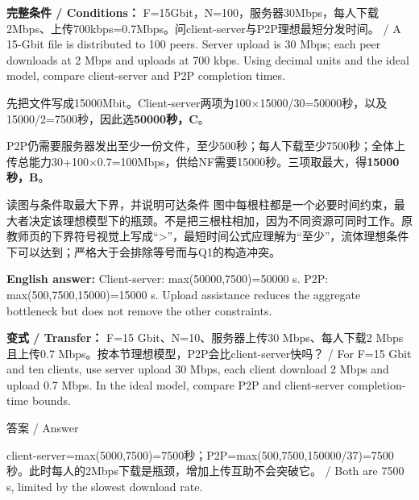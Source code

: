 \textbf{完整条件 / Conditions：} F=15Gbit，N=100，服务器30Mbps，每人下载2Mbps、上传700kbps=0.7Mbps。问client-server与P2P理想最短分发时间。 / A 15-Gbit file is distributed to 100 peers. Server upload is 30 Mbps; each peer downloads at 2 Mbps and uploads at 700 kbps. Using decimal units and the ideal model, compare client-server and P2P completion times.


先把文件写成15000Mbit。Client-server两项为100\ensuremath{\times}15000/30=50000秒，以及15000/2=7500秒，因此选\textbf{50000秒，C}。


P2P仍需要服务器发出至少一份文件，至少500秒；每人下载至少7500秒；全体上传总能力30+100\ensuremath{\times}0.7=100Mbps，供给NF需要15000秒。三项取最大，得\textbf{15000秒，B}。




\begin{StudyBlock}{读图与条件}{取最大下界，并说明可达条件}
图中每根柱都是一个必要时间约束，最大者决定该理想模型下的瓶颈。不是把三根柱相加，因为不同资源可同时工作。原教师页的下界符号视觉上写成“>”，最短时间公式应理解为“至少”，流体理想条件下可以达到；严格大于会排除等号而与Q1的构造冲突。
\end{StudyBlock}


\textbf{English answer:} Client-server: max(50000,7500)=50000 s. P2P: max(500,7500,15000)=15000 s. Upload assistance reduces the aggregate bottleneck but does not remove the other constraints.


\textbf{变式 / Transfer：} F=15 Gbit、N=10、服务器上传30 Mbps、每人下载2 Mbps且上传0.7 Mbps。按本节理想模型，P2P会比client-server快吗？ / For F=15 Gbit and ten clients, use server upload 30 Mbps, each client download 2 Mbps and upload 0.7 Mbps. In the ideal model, compare P2P and client-server completion-time bounds.



\begin{StudySolution}{答案 / Answer}


client-server=max(5000,7500)=7500秒；P2P=max(500,7500,150000/37)=7500秒。此时每人的2Mbps下载是瓶颈，增加上传互助不会突破它。 / Both are 7500 s, limited by the slowest download rate.


\end{StudySolution}








